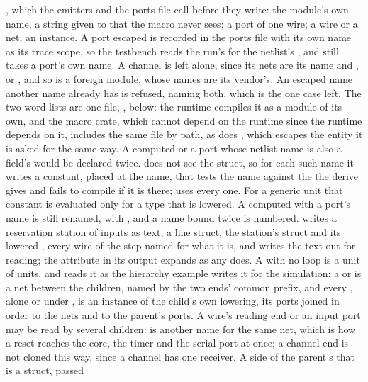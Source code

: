 , which the emitters and the ports file call
before they write: the module's own name, a string given to
 that the macro never sees; a port of one wire; a wire
or a net; an instance. A port escaped is recorded in the ports file
with its own name as its trace scope, so the testbench reads the
run's  for the netlist's , and
 still takes a port's own name. A channel is left
alone, since its nets are its name and , 
or , and so is a foreign module, whose names are its
vendor's. An escaped name another name already has is refused,
naming both, which is the one case left. The two word lists are one
file, , below: the runtime compiles it as
a module of its own, and the macro crate, which cannot depend on the
runtime since the runtime depends on it, includes the same file by
path, as does , which escapes the entity it is
asked for the same way. A computed  or a
port whose netlist name is also a field's would be declared twice.
\code{\#[lower]} does not see the struct, so for each such name it
writes a constant, placed at the name, that tests the name against the
 the derive gives  and fails to compile if it
is there;  uses every one. For a generic unit that
constant is evaluated only for a type that is lowered. A computed
 with a port's name is still renamed, with , and a
name bound twice is numbered.
 writes a reservation
station of  inputs as text, a line struct, the station's
struct and its lowered , every wire of the step named for
what it is, and  writes the text out for
reading; the attribute in its output expands as any does.
A  with no loop is a unit of units, and \code{\#[lower]}
reads it as the hierarchy example writes it for the simulation: a
 or  is a net between the children, named by the two
ends' common prefix, and every , alone or under , is an instance of the
child's own lowering, its ports joined in order to the nets and to
the parent's ports. A wire's reading end or an input port may be read
by several children:  is another name for the
same net, which is how a reset reaches the core, the timer and the
serial port at once; a channel end is not cloned this way, since a
channel has one receiver. A side of the parent's that is a struct, passed
